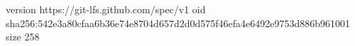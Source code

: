 version https://git-lfs.github.com/spec/v1
oid sha256:542e3a80cfaa6b36e74e8704d657d2d0d575f46efa4e6492e9753d886b961001
size 258
